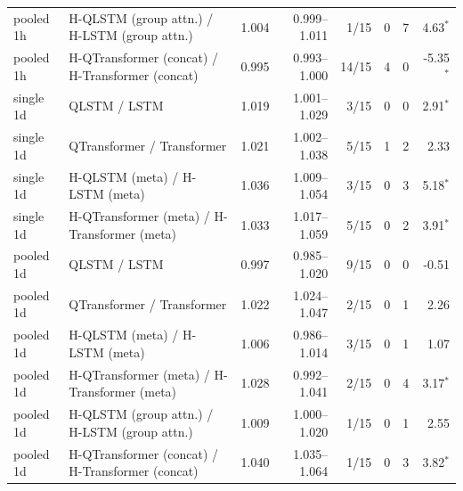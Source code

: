 \begin{tabular}{llrrrrrr}
pooled 1h & H-QLSTM (group attn.) / H-LSTM (group attn.) & 1.004 & 0.999--1.011 & 1/15 & 0 & 7 & 4.63$^{*}$ \\
pooled 1h & H-QTransformer (concat) / H-Transformer (concat) & 0.995 & 0.993--1.000 & 14/15 & 4 & 0 & -5.35$^{*}$ \\
single 1d & QLSTM / LSTM & 1.019 & 1.001--1.029 & 3/15 & 0 & 0 & 2.91$^{*}$ \\
single 1d & QTransformer / Transformer & 1.021 & 1.002--1.038 & 5/15 & 1 & 2 & 2.33 \\
single 1d & H-QLSTM (meta) / H-LSTM (meta) & 1.036 & 1.009--1.054 & 3/15 & 0 & 3 & 5.18$^{*}$ \\
single 1d & H-QTransformer (meta) / H-Transformer (meta) & 1.033 & 1.017--1.059 & 5/15 & 0 & 2 & 3.91$^{*}$ \\
pooled 1d & QLSTM / LSTM & 0.997 & 0.985--1.020 & 9/15 & 0 & 0 & -0.51 \\
pooled 1d & QTransformer / Transformer & 1.022 & 1.024--1.047 & 2/15 & 0 & 1 & 2.26 \\
pooled 1d & H-QLSTM (meta) / H-LSTM (meta) & 1.006 & 0.986--1.014 & 3/15 & 0 & 1 & 1.07 \\
pooled 1d & H-QTransformer (meta) / H-Transformer (meta) & 1.028 & 0.992--1.041 & 2/15 & 0 & 4 & 3.17$^{*}$ \\
pooled 1d & H-QLSTM (group attn.) / H-LSTM (group attn.) & 1.009 & 1.000--1.020 & 1/15 & 0 & 1 & 2.55 \\
pooled 1d & H-QTransformer (concat) / H-Transformer (concat) & 1.040 & 1.035--1.064 & 1/15 & 0 & 3 & 3.82$^{*}$ \\
\bottomrule
\end{tabular}

